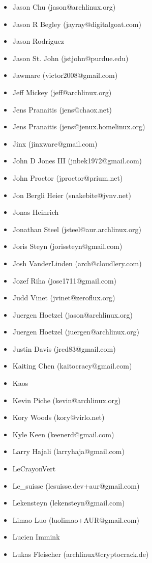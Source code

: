 \begin{latin}
\begin{itemize}
\item  Jason Chu (jason@archlinux.org)
\item  Jason R Begley (jayray@digitalgoat.com)
\item  Jason Rodriguez
\item  Jason St. John (jstjohn@purdue.edu)
\item  Jawmare (victor2008@gmail.com)
\item  Jeff Mickey (jeff@archlinux.org)
\item  Jens Pranaitis (jens@chaox.net)
\item  Jens Pranaitis (jens@jenux.homelinux.org)
\item  Jinx (jinxware@gmail.com)
\item  John D Jones III (jnbek1972@gmail.com)
\item  John Proctor (jproctor@prium.net)
\item  Jon Bergli Heier (snakebite@jvnv.net)
\item  Jonas Heinrich
\item  Jonathan Steel (jsteel@aur.archlinux.org)
\item  Joris Steyn (jorissteyn@gmail.com)
\item  Josh VanderLinden (arch@cloudlery.com)
\item  Jozef Riha (jose1711@gmail.com)
\item  Judd Vinet (jvinet@zeroflux.org)
\item  Juergen Hoetzel (jason@archlinux.org)
\item  Juergen Hoetzel (juergen@archlinux.org)
\item  Justin Davis (jrcd83@gmail.com)
\item  Kaiting Chen (kaitocracy@gmail.com)
\item  Kaos
\item  Kevin Piche (kevin@archlinux.org)
\item  Kory Woods (kory@virlo.net)
\item  Kyle Keen (keenerd@gmail.com)
\item  Larry Hajali (larryhaja@gmail.com)
\item  LeCrayonVert
\item  Le\_suisse (lesuisse.dev+aur@gmail.com)
\item  Lekensteyn (lekensteyn@gmail.com)
\item  Limao Luo (luolimao+AUR@gmail.com)
\item  Lucien Immink
\item  Lukas Fleischer (archlinux@cryptocrack.de)

\end{itemize}
\end{latin}

